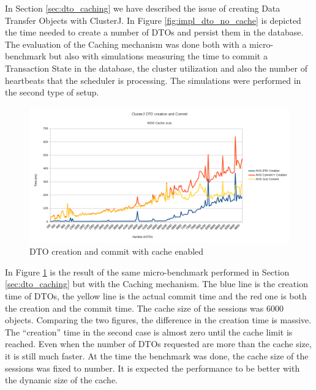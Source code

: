 In Section \ref{sec:dto_caching} we have described the issue of
creating Data Transfer Objects with ClusterJ. In Figure
\ref{fig:impl_dto_no_cache} is depicted the time needed to create a number of
DTOs and persist them in the database. The evaluation of the Caching
mechanism was done both with a micro-benchmark but also with simulations
measuring the time to commit a Transaction State in the database,
the cluster utilization and also the number of heartbeats that the
scheduler is processing. The simulations were performed in the second
type of setup.

\begin{figure}
\centering
\includegraphics[scale=0.5]{resources/images/Evaluation/dto_creation_cache_bench.png}
\caption{DTO creation and commit with cache enabled}
\label{fig:ev_dto_creation_bench}
\end{figure}

In Figure \ref{fig:ev_dto_creation_bench} is the result of the same
micro-benchmark performed in Section \ref{sec:dto_caching} but with
the Caching mechanism. The blue line is the creation time of DTOs, the
yellow line is the actual commit time and the red one is both the
creation and the commit time. The cache size of the sessions was 6000
objects. Comparing the two figures, the difference in the creation
time is massive. The ``creation'' time in the second case is almost
zero until the cache limit is reached. Even when the number of DTOs
requested are more than the cache size, it is still much faster. At
the time the benchmark was done, the cache size of the sessions was
fixed to number. It is expected the performance to be better with the
dynamic size of the cache.


